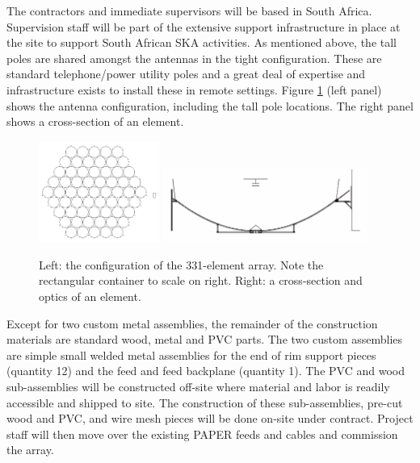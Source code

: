 \documentclass[preprint]{aastex}
\begin{document}
The contractors and immediate supervisors will be based in South Africa.  Supervision staff 
will be part of the extensive support infrastructure in place at the site to support South African SKA activities.
As mentioned above, the tall poles are shared amongst the antennas in the tight configuration.  
These are standard telephone/power 
utility poles and a great deal of  expertise and infrastructure exists to install these in remote settings.  
Figure \ref{fig:config_optics} (left panel) shows the antenna configuration, including the tall pole locations.
The right panel shows a cross-section of an element.

\begin{figure}[h]
	\centering
		\includegraphics[width=0.35\textwidth]{plots/Engineering/hex_61.png} %
		\includegraphics[width=0.6\textwidth]{plots/Engineering/optics.png}
\caption{\small
Left: the configuration of the 331-element array.  Note the rectangular container to scale on right.
		Right: a cross-section and optics of an element.}
	\label{fig:config_optics}
\end{figure}

Except for two custom metal assemblies, the remainder of the construction materials are standard wood, 
metal and PVC parts.  The two custom assemblies are simple small welded metal assemblies for the end of 
rim support pieces (quantity 12) and the feed and feed backplane (quantity 1).  The PVC and wood sub-assemblies 
will be constructed off-site where material and labor is readily accessible and shipped to site.  The 
construction of these sub-assemblies, pre-cut wood and PVC, and wire mesh pieces will be done on-site under 
contract.  Project staff will then move over the existing PAPER feeds and cables and commission the array.  
\end{document}

